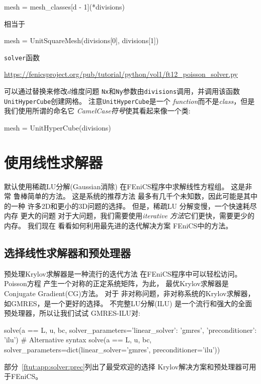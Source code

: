 \begin{python}
mesh = mesh_classes[d - 1](*divisions)
\end{python}
相当于

\begin{python}
mesh = UnitSquareMesh(divisions[0], divisions[1])
\end{python}

\texttt{solver}函数
\begin{center}
\url{https://fenicsproject.org/pub/tutorial/python/vol1/ft12_poisson_solver.py}
\end{center}
可以通过替换来修改$d$维度问题
\texttt{Nx}和\texttt{Ny}参数由\texttt{divisions}调用，并调用该函数
\texttt{UnitHyperCube}创建网格。 注意\texttt{UnitHyperCube}是一个
\emph{function}而不是\emph{class}，但是我们使用所谓的命名它
\emph{CamelCase符号}使其看起来像一个类:

\begin{python}
mesh = UnitHyperCube(divisions)
\end{python}

\section{使用线性求解器}
\label{ch:poisson0:solve:prm}

默认使用稀疏LU分解(Gaussian消除)
在FEniCS程序中求解线性方程组。 这是非常
鲁棒简单的方法。 这是系统的推荐方法
最多有几千个未知数，因此可能是其中的一种
许多2D和更小的3D问题的选择。 但是，稀疏LU
分解变慢，一个快速耗尽内存
更大的问题 对于大问题，我们需要使用\emph{iterative
方法}它们更快，需要更少的内存。 我们现在
看看如何利用最先进的迭代解决方案
FEniCS中的方法。

\subsection{选择线性求解器和预处理器}


预处理Krylov求解器是一种流行的迭代方法
在FEniCS程序中可以轻松访问。 Poisson方程
产生一个对称的正定系统矩阵，为此，
最优Krylov求解器是Conjugate Gradient(CG)方法。 对于
非对称问题，非对称系统的Krylov求解器，
如GMRES，是一个更好的选择。 不完整LU分解(ILU)
是一个流行和强大的全面预处理器，所以让我们试试
GMRES-ILU对:

\begin{python}
solve(a == L, u, bc,
      solver_parameters={'linear_solver': 'gmres',
                         'preconditioner': 'ilu'})
# Alternative syntax
solve(a == L, u, bc,
      solver_parameters=dict(linear_solver='gmres',
                             preconditioner='ilu'))
\end{python}
部分~\ref{ftut:app:solver:prec}列出了最受欢迎的选择
Krylov解决方案和预处理器可用于FEniCS。

